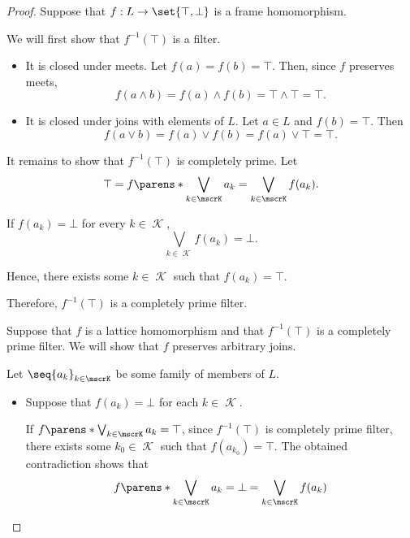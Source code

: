 \begin{proof}
  \SufficiencySubProof Suppose that \( f: L \to \set{ \top, \bot } \) is a frame homomorphism.

  We will first show that \( f^{-1}(\top) \) is a filter.
  \begin{itemize}
    \item It is closed under meets. Let \( f(a) = f(b) = \top \). Then, since \( f \) preserves meets,
    \begin{equation*}
      f(a \wedge b) = f(a) \wedge f(b) = \top \wedge \top = \top.
    \end{equation*}

    \item It is closed under joins with elements of \( L \). Let \( a \in L \) and \( f(b) = \top \). Then
    \begin{equation*}
      f(a \vee b) = f(a) \vee f(b) = f(a) \vee \top = \top.
    \end{equation*}
  \end{itemize}

  It remains to show that \( f^{-1}(\top) \) is completely prime. Let
  \begin{equation*}
    \top = f\parens*{ \bigvee_{k \in \mscrK} a_k } = \bigvee_{k \in \mscrK} f(a_k).
  \end{equation*}

  If \( f(a_k) = \bot \) for every \( k \in \mscrK \),
  \begin{equation*}
    \bigvee_{k \in \mscrK} f(a_k) = \bot.
  \end{equation*}

  Hence, there exists some \( k \in \mscrK \) such that \( f(a_k) = \top \).

  Therefore, \( f^{-1}(\top) \) is a completely prime filter.

  \NecessitySubProof Suppose that \( f \) is a lattice homomorphism and that \( f^{-1}(\top) \) is a completely prime filter. We will show that \( f \) preserves arbitrary joins.

  Let \( \seq{ a_k }_{k \in \mscrK} \) be some family of members of \( L \).
  \begin{itemize}
    \item Suppose that \( f(a_k) = \bot \) for each \( k \in \mscrK \).

    If \( f\parens*{ \bigvee_{k \in \mscrK} a_k } = \top \), since \( f^{-1}(\top) \) is completely prime filter, there exists some \( k_0 \in \mscrK \) such that \( f(a_{k_0}) = \top \). The obtained contradiction shows that
    \begin{equation*}
      f\parens*{ \bigvee_{k \in \mscrK} a_k } = \bot = \bigvee_{k \in \mscrK} f(a_k)
    \end{equation*}


\end{itemize}
\end{proof}

